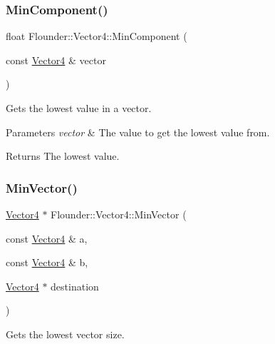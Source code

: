 \subsubsection{\texorpdfstring{Min\+Component()}{MinComponent()}}
{\footnotesize\ttfamily float Flounder\+::\+Vector4\+::\+Min\+Component (\begin{DoxyParamCaption}\item[{const \hyperlink{class_flounder_1_1_vector4}{Vector4} \&}]{vector }\end{DoxyParamCaption})\hspace{0.3cm}{\ttfamily [static]}}



Gets the lowest value in a vector. 


\begin{DoxyParams}{Parameters}
{\em vector} & The value to get the lowest value from. \\
\hline
\end{DoxyParams}
\begin{DoxyReturn}{Returns}
The lowest value. 
\end{DoxyReturn}
\mbox{\label{class_flounder_1_1_vector4_ad5dc758c92bea8408b312723c7b09eec}} 
\subsubsection{\texorpdfstring{Min\+Vector()}{MinVector()}}
{\footnotesize\ttfamily \hyperlink{class_flounder_1_1_vector4}{Vector4} $\ast$ Flounder\+::\+Vector4\+::\+Min\+Vector (\begin{DoxyParamCaption}\item[{const \hyperlink{class_flounder_1_1_vector4}{Vector4} \&}]{a,  }\item[{const \hyperlink{class_flounder_1_1_vector4}{Vector4} \&}]{b,  }\item[{\hyperlink{class_flounder_1_1_vector4}{Vector4} $\ast$}]{destination }\end{DoxyParamCaption})\hspace{0.3cm}{\ttfamily [static]}}



Gets the lowest vector size. 


